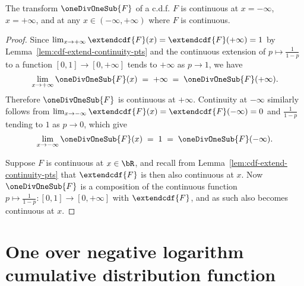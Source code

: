 \begin{lemma}
  \label{lem:one-div-one-sub-cdf-continuity-pts}
  \leanok
  The transform $\oneDivOneSub{F}$ of a c.d.f. $F$ is continuous
  at $x = -\infty$, $x = + \infty$, and at any
  $x \in (-\infty,+\infty)$ where $F$ is continuous.
\end{lemma}
\begin{proof}
  Since $\lim_{x \to +\infty} \extendcdf{F}(x) = \extendcdf{F}(+\infty) = 1$
  by Lemma~\ref{lem:cdf-extend-continuity-pts} and the continuous extension
  of $p \mapsto \frac{1}{1-p}$ to a function $[0,1] \to [0,+\infty]$
  tends to $+\infty$ as $p \to 1$, we have
  \begin{align*}
    \lim_{x \to +\infty} \oneDivOneSub{F}(x)
    \; = \; +\infty \; = \; \oneDivOneSub{F}(+\infty) .
  \end{align*}
  Therefore $\oneDivOneSub{F}$ is continuous at $+\infty$.
  Continuity at $-\infty$ similarly follows from
  $\lim_{x \to -\infty} \extendcdf{F}(x) = \extendcdf{F}(-\infty) = 0$
  and $\frac{1}{1-p}$ tending to $1$
  as $p \to 0$, which give
  \begin{align*}
    \lim_{x \to -\infty} \oneDivOneSub{F}(x)
    \; = \; 1 \; = \; \oneDivOneSub{F}(-\infty) .
  \end{align*}

  Suppose $F$ is continuous at $x \in \bR$,
  and recall from Lemma~\ref{lem:cdf-extend-continuity-pts} that
  $\extendcdf{F}$ is then also continuous at $x$.
  Now $\oneDivOneSub{F}$ is a composition of the continuous function
  $p \mapsto \frac{1}{1-p} \colon [0,1] \to [0,+\infty]$ with
  $\extendcdf{F}$, and as such also becomes continuous at $x$.
\end{proof}

\section{One over negative logarithm cumulative distribution function}

